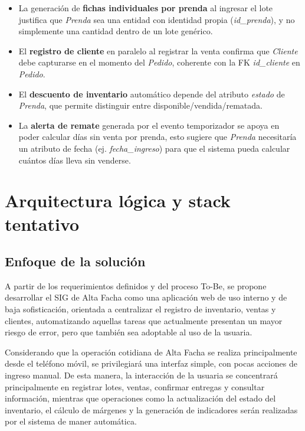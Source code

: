 \documentclass[11pt,letterpaper]{article}
\begin{document}
\begin{itemize}
    \item La generación de \textbf{fichas individuales por prenda} al ingresar el lote justifica que \emph{Prenda} sea una entidad con identidad propia (\emph{id\_prenda}), y no simplemente una cantidad dentro de un lote genérico.
    \item El \textbf{registro de cliente} en paralelo al registrar la venta confirma que \emph{Cliente} debe capturarse en el momento del \emph{Pedido}, coherente con la FK \emph{id\_cliente} en \emph{Pedido}.
    \item El \textbf{descuento de inventario} automático depende del atributo \emph{estado} de \emph{Prenda}, que permite distinguir entre disponible/vendida/rematada.
    \item La \textbf{alerta de remate} generada por el evento temporizador se apoya en poder calcular días sin venta por prenda, esto sugiere que \emph{Prenda} necesitaría un atributo de fecha (ej. \emph{fecha\_ingreso}) para que el sistema pueda calcular cuántos días lleva sin venderse.
\end{itemize}


\newpage

\section{Arquitectura lógica y stack tentativo}

\subsection*{Enfoque de la solución}

A partir de los requerimientos definidos y del proceso To-Be, se propone desarrollar el 
SIG de Alta Facha como una aplicación web de uso interno y de baja sofisticación, 
orientada a centralizar el registro de inventario, ventas y clientes, 
automatizando aquellas tareas que actualmente presentan un mayor riesgo de error, pero que también sea adoptable al uso de la usuaria.

Considerando que la operación cotidiana de Alta Facha se realiza principalmente desde 
el teléfono móvil, se privilegiará una interfaz simple, con pocas acciones de ingreso 
manual. De esta manera, la interacción de la usuaria se concentrará principalmente en 
registrar lotes, ventas, confirmar entregas y consultar información, mientras 
que operaciones como la actualización del estado del inventario, el cálculo de márgenes 
y la generación de indicadores serán realizadas por el sistema de maner automática.
\end{document}
